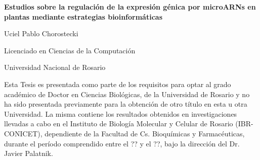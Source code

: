 
\begin{declaration}

\begin{center}

{\Large \bfseries{Estudios sobre la regulación de la expresión génica por microARNs en plantas mediante estrategias bioinformáticas} \par} 
\vspace*{3em}

{\Large Uciel Pablo Chorostecki \par} 
\vspace*{2em}
{\Large Licenciado en Ciencias de la Computación \par} 
\vspace*{.5em}
{\Large Universidad Nacional de Rosario\par} 
\vspace*{3em}

\end{center}


Esta Tesis es presentada como parte de los requisitos para optar al grado académico de Doctor en Ciencias Biológicas, 
 de la Universidad de Rosario y no ha sido presentada previamente para la obtención de otro título en esta u otra Universidad. 
 La misma contiene los resultados obtenidos en investigaciones llevadas a cabo en el Instituto de Biología Molecular y Celular de Rosario (IBR-CONICET),
 dependiente de la Facultad de Cs. Bioquímicas y Farmacéuticas, durante el período comprendido entre el ?? y el ??, 
 bajo la dirección del Dr. Javier Palatnik.



\end{declaration}

